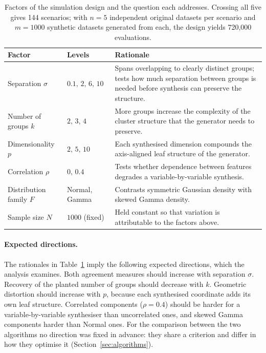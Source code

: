 \documentclass[pdflatex,referee]{sn-jnl}
\begin{document}
\begin{table}[!tbp]
\centering
\caption{Factors of the simulation design and the question each addresses.
         Crossing all five gives 144 scenarios; with $n=5$ independent original
         datasets per scenario and $m=1000$ synthetic datasets generated from
         each, the design yields 720{,}000 evaluations.}
\label{tab:design}
\small
\begin{tabular}{llp{6.2cm}}
\toprule
Factor & Levels & Rationale \\
\midrule
Separation $\sigma$      & $0.1,\,2,\,6,\,10$ & Spans overlapping to clearly
  distinct groups; tests how much separation between groups is needed before
  synthesis can preserve the structure. \\
Number of groups $k$     & $2,\,3,\,4$        & More groups increase the
  complexity of the cluster structure that the generator needs to
  preserve. \\
Dimensionality $p$       & $2,\,5,\,10$       & Each synthesised dimension
  compounds the axis-aligned leaf structure of the generator. \\
Correlation $\rho$       & $0,\,0.4$          & Tests whether dependence
  between features degrades a variable-by-variable synthesis. \\
Distribution family $F$  & Normal, Gamma      & Contrasts symmetric Gaussian
  density with skewed Gamma density. \\
\midrule
Sample size $N$          & $1000$ (fixed)     & Held constant so that
  variation is attributable to the factors above. \\
\bottomrule
\end{tabular}
\end{table}

\paragraph{Expected directions.} The rationales in Table~\ref{tab:design}
imply the following expected directions, which the analysis examines. Both
agreement measures should increase with separation $\sigma$. Recovery of the
planted number of groups should decrease with $k$. Geometric distortion should
increase with $p$, because each synthesised coordinate adds its own leaf
structure. Correlated components ($\rho = 0.4$) should be harder for a
variable-by-variable synthesiser than uncorrelated ones, and skewed Gamma
components harder than Normal ones. For the comparison between the two
algorithms no direction was fixed in advance: they share a criterion and
differ in how they optimise it (Section~\ref{sec:algorithms}).
\end{document}
